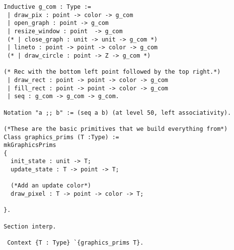 \documentclass{llncs}
\begin{document}
\begin{lstlisting}
   Inductive g_com : Type :=
    | draw_pix : point -> color -> g_com
    | open_graph : point -> g_com
    | resize_window : point  -> g_com
    (* | close_graph : unit -> unit -> g_com *)
    | lineto : point -> point -> color -> g_com
    (* | draw_circle : point -> Z -> g_com *)

   (* Rec with the bottom left point followed by the top right.*)          
    | draw_rect : point -> point -> color -> g_com
    | fill_rect : point -> point -> color -> g_com
    | seq : g_com -> g_com -> g_com.

   Notation "a ;; b" := (seq a b) (at level 50, left associativity).

   (*These are the basic primitives that we build everything from*)
   Class graphics_prims (T :Type) :=
   mkGraphicsPrims
   {
     init_state : unit -> T;
     update_state : T -> point -> T;

     (*Add an update color*)
     draw_pixel : T -> point -> color -> T;

   }.

   Section interp.

    Context {T : Type} `{graphics_prims T}.
  \end{lstlisting}
\end{document}

